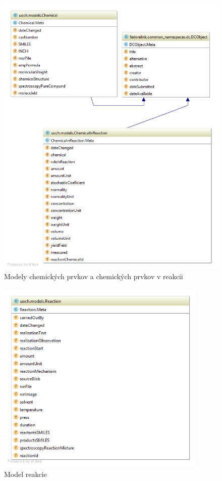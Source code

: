 \documentclass[thesis=M,slovak]{FITthesis}[2013/05/06]
\begin{document}
\begin{figure}\centering
	\includegraphics[width=1.0\textwidth]{diagramy/UOCH_Chemical.png}
 	\caption[Modely chemických prvkov a chemických prvkov v reakcii]{Modely chemických prvkov a chemických prvkov v reakcii}\label{graphics:Chemical}
\end{figure}

\begin{figure}\centering
	\includegraphics[width=0.9\textwidth]{diagramy/UOCH_Reaction.png}
 	\caption[Model reakcie]{Model reakcie}\label{graphics:Reaction}
\end{figure}
\end{document}
